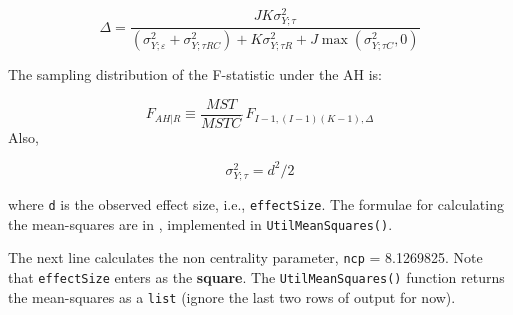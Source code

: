 \documentclass[]{book}
\newenvironment{Shaded}{\begin{snugshade}}{\end{snugshade}}
\newcommand{\CommentTok}[1]{\textcolor[rgb]{0.56,0.35,0.01}{\textit{#1}}}
\newcommand{\DataTypeTok}[1]{\textcolor[rgb]{0.13,0.29,0.53}{#1}}
\newcommand{\DecValTok}[1]{\textcolor[rgb]{0.00,0.00,0.81}{#1}}
\newcommand{\FloatTok}[1]{\textcolor[rgb]{0.00,0.00,0.81}{#1}}
\newcommand{\KeywordTok}[1]{\textcolor[rgb]{0.13,0.29,0.53}{\textbf{#1}}}
\newcommand{\NormalTok}[1]{#1}
\newcommand{\OperatorTok}[1]{\textcolor[rgb]{0.81,0.36,0.00}{\textbf{#1}}}
\newcommand{\StringTok}[1]{\textcolor[rgb]{0.31,0.60,0.02}{#1}}
\begin{document}
\[\Delta =\frac{JK\sigma _{Y;\tau }^{2}}{\left( \sigma _{Y;\varepsilon }^{2}+\sigma _{Y;\tau RC}^{2} \right)+K\sigma _{Y;\tau R}^{2}+J\max \left( \sigma _{Y;\tau C}^{2},0 \right)}\]

The sampling distribution of the F-statistic under the AH is:

\[{{F}_{\left. AH \right|R}}\equiv \frac{MST}{MSTC}\tilde{\ }{{F}_{I-1,\left( I-1 \right)\left( K-1 \right),\Delta }}\]
Also,

\[\sigma _{Y;\tau }^{2}={{d}^{2}}/2\]

where \texttt{d} is the observed effect size, i.e., \texttt{effectSize}. The formulae for calculating the mean-squares are in \citep{RN1476}, implemented in \texttt{UtilMeanSquares()}.

\begin{Shaded}
\end{Shaded}

The next line calculates the non centrality parameter, \texttt{ncp} = 8.1269825. Note that \texttt{effectSize} enters as the \textbf{square}. The \texttt{UtilMeanSquares()} function returns the mean-squares as a \texttt{list} (ignore the last two rows of output for now).
\end{document}
